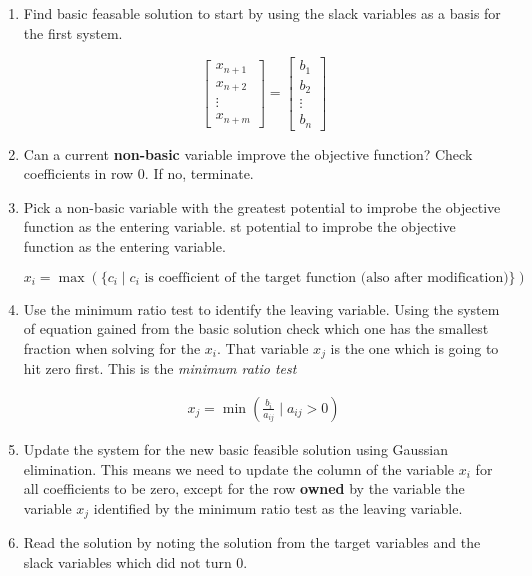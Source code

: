 \begin{enumerate}

	\item Find basic feasable solution to start by using the slack variables as a basis for the first system.

	      \[
		      \begin{bmatrix}
			      x_{n + 1} \\
			      x_{n + 2} \\
			      \vdots    \\
			      x_{n + m}
		      \end{bmatrix}
		      =
		      \begin{bmatrix}
			      b_1    \\
			      b_2    \\
			      \vdots \\
			      b_n
		      \end{bmatrix}
	      \]

	\item Can a current \textbf{non-basic} variable improve the objective function? Check coefficients in row 0. If no, terminate.

	\item Pick a non-basic variable with the greatest potential to improbe the objective function as the entering variable.
	      st potential to improbe the objective function as the entering variable.

	      \[
		      x_{i} = \max (\{c_i \mid c_i \text{ is coefficient of the target function (also after modification)}\})
	      \]

	\item Use the minimum ratio test to identify the leaving variable. Using the system of equation gained from the basic solution check which one has the
	      smallest fraction when solving for the \(x_i\). That variable \(x_j\) is the one which is going to hit zero first. This is the \emph{minimum ratio test}

	      \begin{align*}
		      x_j = \min \left( \frac{b_i}{a_{ij}} \mid a_{ij} > 0 \right)
	      \end{align*}

	\item Update the system for the new basic feasible solution using Gaussian elimination.
	      This means we need to update the column of the variable \(x_i\) for all coefficients to be zero, except for the row \textbf{owned} by
	      the variable the variable \(x_j\) identified by the minimum ratio test as the leaving variable.

	\item Read the solution by noting the solution from the target variables and the slack variables which did not turn 0.

\end{enumerate}

